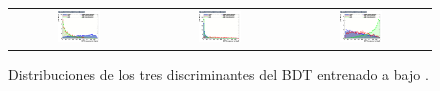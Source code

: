 \begin{figure}[htbp]
  \centering
  \setlength{\tabcolsep}{1.5pt}
  \renewcommand{\arraystretch}{0}
  \begin{tabular}{@{}c c c@{}}
    \includegraphics[width=0.33\textwidth]{images/plots_overtrain_lt200/overtrain_Signal_BDTG.png} &
    \includegraphics[width=0.33\textwidth]{images/plots_overtrain_lt200/overtrain_bkgZ_BDTG.png} &  
    \includegraphics[width=0.33\textwidth]{images/plots_overtrain_lt200/overtrain_bkgtt_BDTG.png}
  \end{tabular}
  \caption{Distribuciones de los tres discriminantes del BDT entrenado a bajo \pth.}
  \label{lowpt_scores}
\end{figure}

